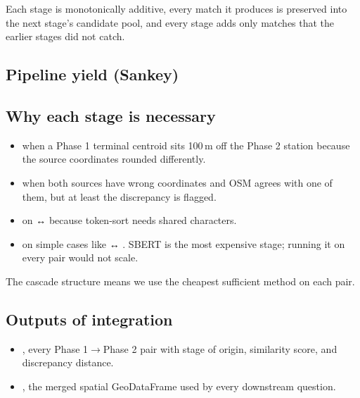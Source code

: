Each stage is monotonically additive, every match it produces is
preserved into the next stage's candidate pool, and every stage adds
only matches that the earlier stages did not catch.

\subsection{Pipeline yield (Sankey)}


\subsection{Why each stage is necessary}

\begin{itemize}
 \item {} when a Phase 1 terminal centroid sits
 100\,m off the Phase 2 station because the source coordinates
 rounded differently.
 \item {} when both sources have wrong
 coordinates and OSM agrees with one of them, but at least
 the discrepancy is flagged.
 \item {} on  ↔ 
 because token-sort needs shared characters.
 \item {} on simple cases like
  ↔ . SBERT is the most
 expensive stage; running it on every pair would not scale.
\end{itemize}

The cascade structure means we use the cheapest sufficient method on
each pair.

\subsection{Outputs of integration}

\begin{itemize}
 \item {}, every Phase 1$\to$Phase 2
 pair with stage of origin, similarity score, and discrepancy
 distance.
 \item {}, the
 merged spatial GeoDataFrame used by every downstream question.
\end{itemize}

